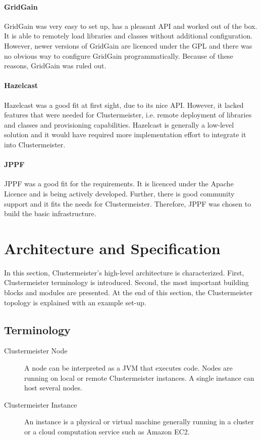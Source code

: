 \documentclass[12pt]{article}
\begin{document}
\paragraph{GridGain} GridGain was very easy to set up, has a pleasant API and worked out of the box. It is able to remotely load libraries and classes without additional configuration. However, newer versions of GridGain are licenced under the GPL and there was no obvious way to configure GridGain programmatically. Because of these reasons, GridGain was ruled out.

\paragraph{Hazelcast} Hazelcast was a good fit at first sight, due to its nice API. However, it lacked features that were needed for Clustermeister, i.e. remote deployment of libraries and classes and provisioning capabilities. Hazelcast is generally a low-level solution and it would have required more implementation effort to integrate it into Clustermeister.

\paragraph{JPPF} JPPF was a good fit for the requirements. It is licenced under the Apache Licence and is being actively developed. Further, there is good community support and it fits the needs for Clustermeister. Therefore, JPPF was chosen to build the basic infrastructure.

\section{Architecture and Specification}
\label{architecture}

In this section, Clustermeister's high-level architecture is characterized. First, Clustermeister terminology is introduced. Second, the most important building blocks and modules are presented. At the end of this section, the Clustermeister topology is explained with an example set-up.

\subsection{Terminology}

\begin{description}
\item[Clustermeister Node] A node can be interpreted as a JVM that executes code. Nodes are running on local or remote Clustermeister instances. A single instance can host several nodes.
\item[Clustermeister Instance] An instance is a physical or virtual machine generally running in a cluster or a cloud computation service such as Amazon EC2.
\end{description}
\end{document}
